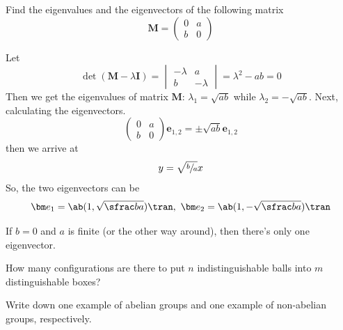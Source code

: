 \begin{problem}
  Find the eigenvalues and the eigenvectors of the following matrix
  \[
    \mathbf M =
    \begin{pmatrix}
      0 & a\\
      b & 0
    \end{pmatrix}
  \]
\end{problem}
\begin{solution}
  Let
  \[
    \det(\mathbf M - \lambda\mathbf I) =
    \begin{vmatrix}
      -\lambda & a\\
      b & -\lambda
    \end{vmatrix} = \lambda^2 - ab = 0
  \]
  Then we get the eigenvalues of matrix $\mathbf M$: $\lambda_1 = \sqrt{ab}$
  while $\lambda_2 = -\sqrt{ab}$.
  Next, calculating the eigenvectors.
  \[
    \begin{pmatrix}
      0 & a\\
      b & 0
    \end{pmatrix}
    \bm e_{1,2} = \pm \sqrt{ab} \bm e_{1,2}
  \]
  then we arrive at
  \[y = \sqrt{\sfrac ba} x\]
  So, the two eigenvectors can be
  \[
    \bm e_1 = \ab(1,\sqrt{\sfrac ba})\tran,~
    \bm e_2 = \ab(1,-\sqrt{\sfrac ba})\tran
  \]
  \begin{remark}
    If $b = 0$ and $a$ is finite (or the other way around),
    then there's only one eigenvector.
  \end{remark}
\end{solution}

\begin{problem}
  How many configurations are there to put $n$ indistinguishable balls into $m$ distinguishable boxes?
\end{problem}
\begin{solution}

\end{solution}

\begin{problem}
  Write down one example of abelian groups and one example of non-abelian groups, respectively.
\end{problem}
\begin{solution}

\end{solution}
